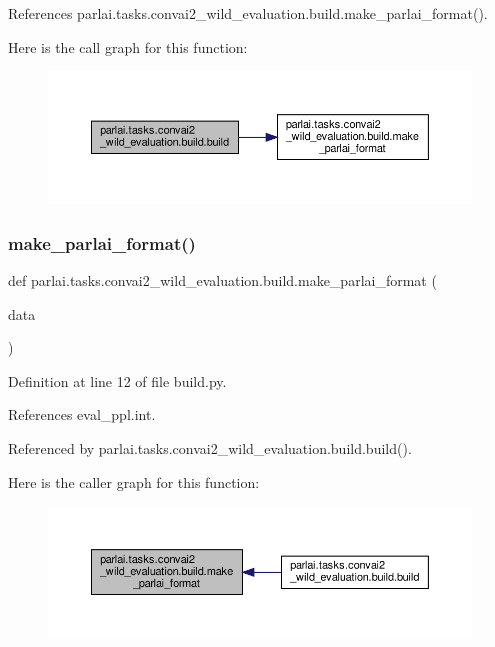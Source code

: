 References parlai.\+tasks.\+convai2\+\_\+wild\+\_\+evaluation.\+build.\+make\+\_\+parlai\+\_\+format().

Here is the call graph for this function\+:
\nopagebreak
\begin{figure}[H]
\begin{center}
\leavevmode
\includegraphics[width=350pt]{namespaceparlai_1_1tasks_1_1convai2__wild__evaluation_1_1build_a7f46320f8766498ee5f87f68e24da31b_cgraph}
\end{center}
\end{figure}
\mbox{\label{namespaceparlai_1_1tasks_1_1convai2__wild__evaluation_1_1build_a6c2b84806e2cb18c6eedb72d161dec5e}} 
\subsubsection{\texorpdfstring{make\+\_\+parlai\+\_\+format()}{make\_parlai\_format()}}
{\footnotesize\ttfamily def parlai.\+tasks.\+convai2\+\_\+wild\+\_\+evaluation.\+build.\+make\+\_\+parlai\+\_\+format (\begin{DoxyParamCaption}\item[{}]{data }\end{DoxyParamCaption})}



Definition at line 12 of file build.\+py.



References eval\+\_\+ppl.\+int.



Referenced by parlai.\+tasks.\+convai2\+\_\+wild\+\_\+evaluation.\+build.\+build().

Here is the caller graph for this function\+:
\nopagebreak
\begin{figure}[H]
\begin{center}
\leavevmode
\includegraphics[width=350pt]{namespaceparlai_1_1tasks_1_1convai2__wild__evaluation_1_1build_a6c2b84806e2cb18c6eedb72d161dec5e_icgraph}
\end{center}
\end{figure}
